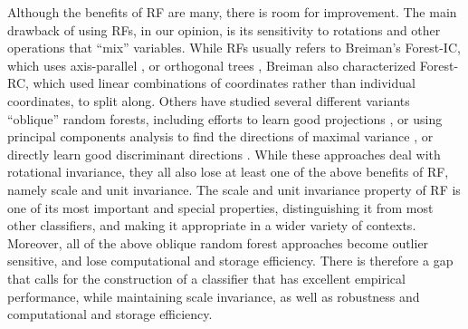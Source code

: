 \documentclass{article} %
\begin{document}
Although the benefits of RF are many, there is room for improvement. The main drawback of using RFs, in our opinion, is its sensitivity to rotations and other operations that ``mix'' variables.  While RFs usually refers to Breiman's Forest-IC, which uses axis-parallel \cite{Heath1993}, or orthogonal trees \cite{Menze2011}, Breiman also characterized Forest-RC, which used linear combinations of coordinates rather than individual coordinates, to split along.  Others have studied several different variants ``oblique'' random forests, including efforts to learn good projections \cite{Heath1993,Tan2005}, or using principal components analysis to find the directions of maximal variance \cite{Ho1998,Rodriguez2006}, or directly learn good discriminant directions \cite{Menze2011}.  While these approaches deal with rotational invariance, they all also lose at least one of the above benefits of RF, namely scale and unit invariance.  The scale and unit invariance property of RF is one of its most important and special properties, distinguishing it from most other classifiers, and making it appropriate in a wider variety of contexts.  
% 
Moreover, all of the above oblique random forest approaches become outlier sensitive, and lose computational and storage efficiency.
There is therefore a gap that calls for the construction of a classifier that has excellent empirical performance, while maintaining scale invariance, as well as robustness and computational and storage efficiency.
\end{document}
